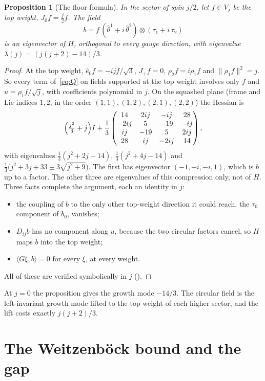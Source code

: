 \documentclass[11pt]{article}
\newtheorem{proposition}[theorem]{Proposition}
\theoremstyle{definition}
\theoremstyle{remark}
\newcommand{\norm}[1]{\lVert #1\rVert}
\begin{document}
\begin{proposition}[The floor formula]\label{prop:bottom}
In the sector of spin $j/2$, let $f\in V_j$ be the top weight, $J_0f=\tfrac j2f$. The field
\[
  b=f\,(\hat\theta^1+i\,\hat\theta^2)\otimes(\tau_1+i\,\tau_2)
\]
is an eigenvector of $H$, orthogonal to every gauge direction, with eigenvalue
$\lambda(j)=(j(j+2)-14)/3$.
\end{proposition}
\begin{proof}
At the top weight, $\hat e_0f=-ijf/\sqrt3$, $J_+f=0$, $\rho_2f=i\rho_1f$ and $\norm{\rho_1f}^2=j$. So
every term of~\eqref{eq:Q} on fields supported at the top weight involves only $f$ and
$u=\rho_1f/\sqrt j$, with coefficients polynomial in $j$. On the squashed plane (frame and Lie indices
$1,2$, in the order $(1,1),(1,2),(2,1),(2,2)$) the Hessian is
\[
  \Bigl(\tfrac{j^2}{3}+j\Bigr)I+\frac13\begin{pmatrix}14&2ij&-ij&28\\-2ij&5&-19&-ij\\ ij&-19&5&2ij\\
  28&ij&-2ij&14\end{pmatrix},
\]
with eigenvalues $\tfrac13(j^2+2j-14)$, $\tfrac13(j^2+4j-14)$ and
$\tfrac13\bigl(j^2+3j+33\pm3\sqrt{j^2+9}\bigr)$. The first has eigenvector $(-1,-i,-i,1)$, which is $b$
up to a factor. The other three are eigenvalues of this compression only, not of $H$. Three facts complete the argument, each an identity in $j$:
\begin{itemize}
  \item the coupling of $b$ to the only other top-weight direction it could reach, the $\tau_0$
    component of $b_0$, vanishes;
  \item $D_{ij}b$ has no component along $u$, because the two circular factors cancel, so $H$ maps $b$
    into the top weight;
  \item $\langle G\xi,b\rangle=0$ for every $\xi$, at every weight.
\end{itemize}
All of these are verified symbolically in $j$ ().
\end{proof}

At $j=0$ the proposition gives the growth mode $-14/3$. The circular field is the left-invariant growth
mode lifted to the top weight of each higher sector, and the lift costs exactly $j(j+2)/3$.

\section{The Weitzenb\"ock bound and the gap}\label{sec:gap}
\end{document}
